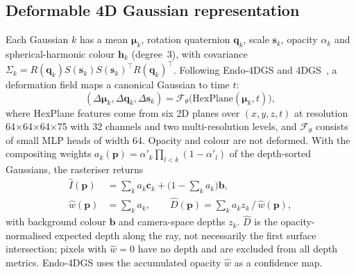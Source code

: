 \documentclass[conference]{IEEEtran}
\begin{document}
\subsection{Deformable 4D Gaussian representation}
Each Gaussian $k$ has a mean $\bm{\mu}_k$, rotation quaternion $\mathbf{q}_k$, scale $\mathbf{s}_k$, opacity $\alpha_k$ and spherical-harmonic colour $\mathbf{h}_k$ (degree~3), with covariance $\Sigma_k=R(\mathbf{q}_k)S(\mathbf{s}_k)S(\mathbf{s}_k)^{\top}R(\mathbf{q}_k)^{\top}$. Following Endo-4DGS and 4DGS~\cite{huang2024endo4dgs,wu2024_4dgs}, a deformation field maps a canonical Gaussian to time $t$:
\begin{equation}
(\Delta\bm{\mu}_k,\Delta\mathbf{q}_k,\Delta\mathbf{s}_k)=\mathcal{F}_\theta\big(\mathrm{HexPlane}(\bm{\mu}_k,t)\big),
\end{equation}
where HexPlane features come from six 2D planes over $(x,y,z,t)$ at resolution 64$\times$64$\times$64$\times$75 with 32 channels and two multi-resolution levels, and $\mathcal{F}_\theta$ consists of small MLP heads of width 64. Opacity and colour are not deformed. With the compositing weights $a_k(\mathbf{p})=\alpha'_k\prod_{l<k}(1-\alpha'_l)$ of the depth-sorted Gaussians, the rasteriser returns
\begin{equation}
\begin{aligned}
\hat{I}(\mathbf{p})&=\textstyle\sum_k a_k\mathbf{c}_k+\big(1-\sum_k a_k\big)\mathbf{b},\\
\hat{w}(\mathbf{p})&=\textstyle\sum_k a_k,\qquad
\hat{D}(\mathbf{p})=\sum_k a_k z_k\,\big/\,\hat{w}(\mathbf{p}),
\end{aligned}
\end{equation}
with background colour $\mathbf{b}$ and camera-space depths $z_k$. $\hat{D}$ is the opacity-normalised expected depth along the ray, not necessarily the first surface intersection; pixels with $\hat{w}{=}0$ have no depth and are excluded from all depth metrics. Endo-4DGS uses the accumulated opacity $\hat{w}$ as a confidence map.
\end{document}
